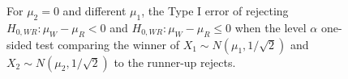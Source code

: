 \documentclass{article}
\begin{document}
\begin{figure}[]
    \centering
    \caption{For $\mu_2=0$ and different $\mu_1$, the Type I error of rejecting $H_{0, WR}: \mu_W - \mu_R < 0$ and  $H_{0, WR}: \mu_W - \mu_R \leq 0$ when the level $\alpha$ one-sided test comparing the winner of $X_1 \sim N(\mu_1, 1/\sqrt{2})$ and $X_2 \sim N(\mu_2, 1/\sqrt{2})$  to the runner-up rejects.}
    \label{fig:warm_up_error_control}
\end{figure}
\end{document}
